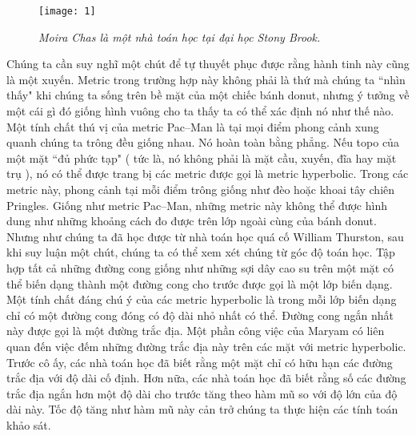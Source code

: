 \begin{multicols}{2}
	\begin{figure}[H]
		\centering
		\vspace*{-5pt}
		\captionsetup{labelformat= empty, justification=centering}
		\texttt{[image: 1]}
		\caption{\small\textit{{\color[named]{codienhiendai}Moira Chas là một nhà toán học tại đại học Stony Brook.}}}
		\vspace*{-10pt}
	\end{figure}
	Chúng ta cần suy nghĩ một chút để {\color[named]{codienhiendai}tự thuyết phục được} rằng hành tinh này cũng là một xuyến. Metric trong trường hợp này không phải là thứ mà chúng ta ``nhìn thấy" khi chúng ta sống trên bề mặt của một chiếc \linebreak bánh donut, nhưng ý tưởng về một cái gì đó giống hình vuông cho ta thấy ta có thể xác \linebreak định nó như thế nào. Một tính chất thú vị của metric Pac--Man là tại mọi điểm phong cảnh xung quanh chúng ta trông đều giống nhau. Nó hoàn toàn bằng phẳng.
	\vskip 0.1cm
	Nếu topo của một mặt ``đủ phức tạp" ( tức là, nó không phải là mặt cầu, xuyến, đĩa hay mặt trụ ), nó có thể được trang bị các \linebreak metric được gọi là metric hyperbolic. Trong các metric này, phong cảnh tại mỗi điểm trông giống như đèo  hoặc  khoai tây chiên Pringles. Giống như metric Pac--Man, những metric này không thể được hình dung như những khoảng cách đo được trên lớp ngoài cùng của bánh donut. Nhưng như chúng ta đã học được từ nhà toán học quá cố William Thurston, sau khi suy luận một chút, chúng ta có thể xem xét chúng từ góc độ toán học.
	\vskip 0.1cm
	Tập hợp tất cả những đường cong giống như những sợi dây cao su trên một mặt có thể biến dạng thành một đường cong cho trước được gọi là một lớp biến dạng. Một tính chất đáng chú ý của các metric hyperbolic là trong mỗi lớp biến dạng chỉ có một đường cong đóng có độ dài nhỏ nhất có thể. Đường cong ngắn nhất này được gọi là một đường \linebreak trắc địa.
	\vskip 0.1cm
	Một phần công việc của Maryam có liên quan đến việc đếm những đường trắc địa này trên các mặt với metric hyperbolic. Trước cô ấy, các nhà toán học đã biết rằng một mặt chỉ có hữu hạn các đường trắc địa với độ dài cố \linebreak định. Hơn nữa, các nhà toán học đã biết rằng số các đường trắc địa ngắn hơn một độ dài cho trước  tăng theo hàm mũ so với độ lớn của độ dài này. Tốc độ tăng như  hàm mũ này cản trở chúng ta thực hiện các tính toán \linebreak khảo sát.

\end{multicols}
